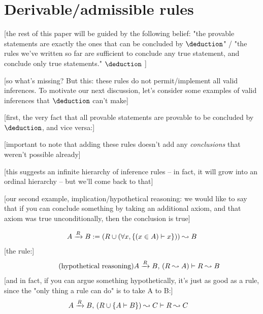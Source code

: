 \documentclass{article}
\begin{document}
  
  
  \iffalse
  
  
  
    
  \section{Derivable/admissible rules}

  [the rest of this paper will be guided by the following belief: "the provable statements are exactly the ones that can be concluded by $\deduction$" / "the rules we've written so far are sufficient to conclude any true statement, and conclude only true statements." $\deduction$ ]
  
  [so what's missing? But this: these rules do not permit/implement all valid inferences. To motivate our next discussion, let's consider some examples of valid inferences that $\deduction$ can't make]
  
  [first, the very fact that all provable statements are provable to be concluded by $\deduction$, and vice versa:]
  
  [important to note that adding these rules doesn't add any \emph{conclusions} that weren't possible already]
   
  [this suggests an infinite hierarchy of inference rules – in fact, it will grow into an ordinal hierarchy – but we'll come back to that]
  
  [our second example, implication/hypothetical reasoning: we would like to say that if you can conclude something by taking an additional axiom, and that axiom was true unconditionally, then the conclusion is true]
  
  \renewcommand{\implies}[1]{\xrightarrow{#1}}
  
  \begin{align*}
    A \implies{R} B := (R \union (\forall x, \singleton{(x \in A) \infrule x})) \concludes B\\
  \end{align*}
  [the rule:]
  \begin{align*}
    \tag{hypothetical reasoning}\label{hyp}
    \globalrule{A \implies{R} B \presep (R \concludes A)}{R \concludes B}\\
  \end{align*}
  [and in fact, if you can argue something hypothetically, it's just as good as a rule, since the "only thing a rule can do" is to take A to B:]
  \begin{align*}
    \globalrule{A \implies{R} B \presep (R \union \singleton{A \infrule B}) \concludes C}{R \concludes C}
  \end{align*}
  
\end{document}
